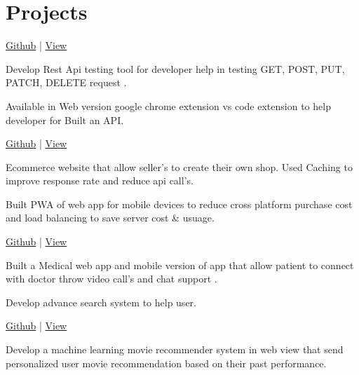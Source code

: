\documentclass[]{deedy-resume-openfont}
\begin{document}
\begin{minipage}[t]{0.66\textwidth}

\section{Projects}
\href{https://github.com/Ajeetbisht/Rest-Api-Tester}{Github} |
\href{https://github.com/Ajeetbisht/Rest-Api-Tester}{View} \\
\begin{tightemize}
\item Develop Rest Api testing tool for developer help in testing GET, POST, PUT, PATCH, DELETE request .
\item Available in Web version google chrome extension vs code extension to help developer for  Built an API.
\end{tightemize}
\sectionsep

\href{https://github.com/Ajeetbisht/Django_ecommerce}{Github} |
\href{https://github.com/Ajeetbisht/Django_ecommerce}{View} \\
\begin{tightemize}
\item Ecommerce website that allow seller's to create their own shop. Used Caching to improve response rate and reduce api call's.
\item Built  PWA of web app for mobile devices to reduce cross platform purchase cost and load balancing to save server cost & usuage.
\end{tightemize}
\sectionsep

\href{https://github.com/Ajeetbisht/Rest-Api-Tester}{Github} |
\href{https://github.com/Ajeetbisht/Rest-Api-Tester}{View} \\
\begin{tightemize}
\item Built a Medical web app and mobile version of app that allow patient to connect with doctor throw video call's and chat support .
\item Develop advance search system to help user.
\end{tightemize}
\sectionsep

\href{https://github.com/Ajeetbisht/Movie-recommendation}{Github} |
\href{https://github.com/Ajeetbisht/Movie-recommendation}{View} \\
\begin{tightemize}
\item Develop a machine learning  movie recommender system in web view that send personalized user movie recommendation based on their past performance.
\end{tightemize}
\sectionsep


\end{minipage}
\end{document}
